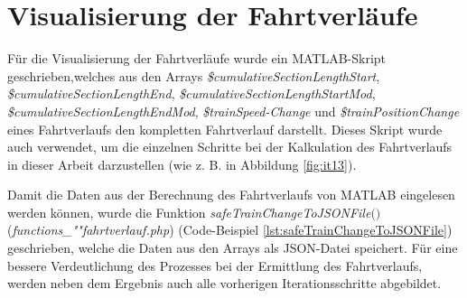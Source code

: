 \section{Visualisierung der Fahrtverläufe} \label{visualisierungFahrtverlaeufe}
Für die Visualisierung der Fahrtverläufe wurde ein MATLAB-Skript geschrieben,\linebreak[4]welches aus den Arrays \textit{\$cu\-mu\-la\-tive\-Sec\-tion\-Length\-Start}, \textit{\$cu\-mu\-la\-tive\-Sec\-tion\-Length\-End}, \textit{\$cu\-mu\-la\-tive\-Sec\-tion\-Length\-Start\-Mod}, \textit{\$cu\-mu\-la\-tive\-Sec\-tion\-Length\-End\-Mod}, \textit{\$train\-Speed-\linebreak[4]Change} und \textit{\$train\-Po\-si\-tion\-Change} eines Fahrtverlaufs den kompletten Fahrtverlauf darstellt. Dieses Skript wurde auch verwendet, um die einzelnen Schritte bei der Kalkulation des Fahrtverlaufs in dieser Arbeit darzustellen (wie z. B. in Abbildung \ref{fig:it13}). 

Damit die Daten aus der Berechnung des Fahrtverlaufs von MATLAB eingelesen werden können, wurde die Funktion \textit{safe\-Train\-Change\-To\-JSON\-File$($$)$} (\textit{func\-tions\_""fahrtverlauf.php}) (Code-Beispiel \ref{lst:safeTrainChangeToJSONFile}) geschrieben, welche die Daten aus den Arrays als JSON-Datei speichert. Für eine bessere Verdeutlichung des Prozesses bei der Ermittlung des Fahrtverlaufs, werden neben dem Ergebnis auch alle vorherigen Iterationsschritte abgebildet.

